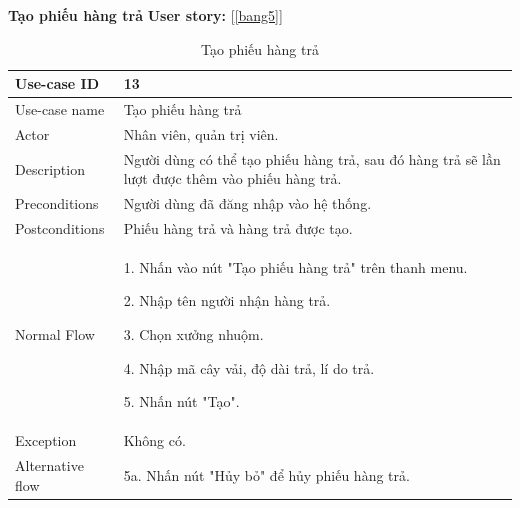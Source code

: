 \newpage
\textbf{Tạo phiếu hàng trả}
\textbf{User story:} [\ref{bang5}]
\begin{table}[!htp]
    \centering
    \begin{tabular}{|m{3cm}|m{10cm}|}
    \hline 
        Use-case ID & 13\\ \hline
        Use-case name & Tạo phiếu hàng trả\\ \hline
        Actor & Nhân viên, quản trị viên.\\ \hline
        Description & Người dùng có thể tạo phiếu hàng trả, sau đó hàng trả sẽ lần lượt được thêm vào phiếu hàng trả.\\ \hline
        Preconditions & Người dùng đã đăng nhập vào hệ thống.\\ \hline
        Postconditions & Phiếu hàng trả và hàng trả được tạo.\\ \hline
        Normal Flow & 
        1. Nhấn vào nút "Tạo phiếu hàng trả" trên thanh menu.\par 
        2. Nhập tên người nhận hàng trả.\par
        3. Chọn xưởng nhuộm.\par 
        4. Nhập mã cây vải, độ dài trả, lí do trả.\par
        5. Nhấn nút "Tạo".
        \\ \hline
        Exception & Không có.
        \\ \hline
        Alternative flow & 
        5a. Nhấn nút "Hủy bỏ" để hủy phiếu hàng trả.
        \\ 
    \hline 
    \end{tabular}
    \caption{Tạo phiếu hàng trả}
    \label{bang13}
\end{table}

